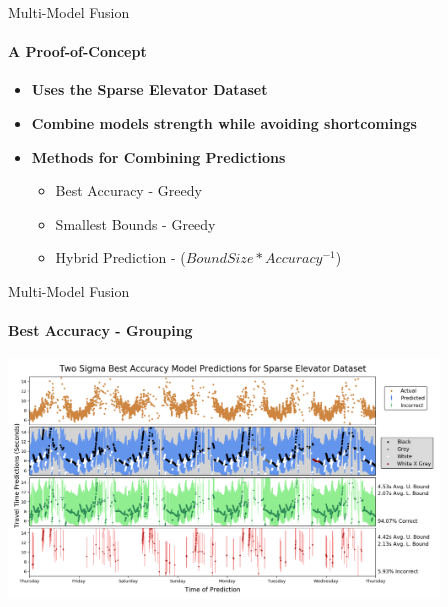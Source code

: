 \documentclass{beamer}
\begin{document}
\begin{frame}[t]{Multi-Model Fusion}
  \framesubtitle{A Proof-of-Concept}
  \vspace*{0.50cm}

  \begin{itemize}
    \setlength\itemsep{1em}
  \item \textbf{Uses the Sparse Elevator Dataset}
  \item \textbf{Combine models strength while avoiding shortcomings}

  \vspace*{0.50cm}

  \item \textbf{Methods for Combining Predictions}
    \begin{itemize}
      \item Best Accuracy - Greedy
      \item Smallest Bounds - Greedy
      \item Hybrid Prediction - ($Bound Size * Accuracy^{-1}$)
    \end{itemize}
  \end{itemize}
\end{frame}




\begin{frame}[t]{Multi-Model Fusion}
  \framesubtitle{Best Accuracy - Grouping}

  {\includegraphics[width = 4.5in]{images/redux/two_sigma_best_accuracy_model_predictions_for_sparse_elevator_dataset.png}}

\end{frame}
\end{document}
